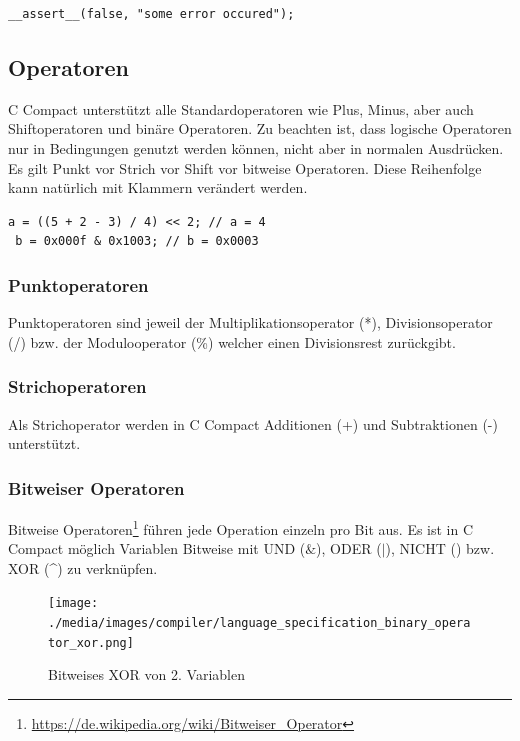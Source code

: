 \begin{lstlisting}[language=CMM]
__assert__(false, "some error occured");
\end{lstlisting}

\newpage
\subsection{Operatoren}

C Compact unterst\"utzt alle Standardoperatoren wie Plus, Minus, aber auch Shiftoperatoren und binäre Operatoren. Zu beachten ist, dass logische Operatoren nur in Bedingungen genutzt werden k\"onnen, nicht aber in normalen Ausdr\"ucken. Es gilt Punkt vor Strich vor Shift vor bitweise Operatoren. Diese Reihenfolge kann nat\"urlich mit Klammern ver\"andert werden.

\begin{lstlisting}[language=CMM]
 a = ((5 + 2 - 3) / 4) << 2; // a = 4
 b = 0x000f & 0x1003; // b = 0x0003
\end{lstlisting}

\subsubsection{Punktoperatoren}

Punktoperatoren sind jeweil der Multiplikationsoperator (*), Divisionsoperator (/) bzw. der Modulooperator (\%) welcher einen Divisionsrest zur\"uckgibt.

\subsubsection{Strichoperatoren}

Als Strichoperator werden in C Compact Additionen (+) und Subtraktionen (-) unterst\"utzt.

\subsubsection{Bitweiser Operatoren}

Bitweise Operatoren\footnote{\url{https://de.wikipedia.org/wiki/Bitweiser_Operator}} f\"uhren jede Operation einzeln pro Bit aus. Es ist in C Compact m\"oglich Variablen Bitweise mit UND ($\&$), ODER ($|$), NICHT (\raisebox{-0.9ex}{\~{ }}) bzw. 
XOR (\^{}) zu verkn\"upfen.

\begin{figure}[h]
\centering
\texttt{[image: ./media/images/compiler/language\_specification\_binary\_operator\_xor.png]}
\caption{Bitweises XOR von 2. Variablen}
\label{language_specification_binary_operator_xor}
\end{figure}

